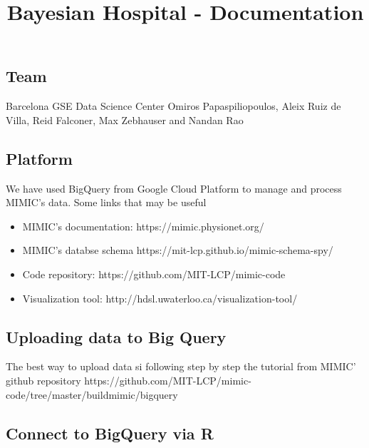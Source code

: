 \documentclass[12pt]{article}
\begin{document}
\def\moveover{\hskip 4.2 true in}





\bigskip

\bigskip


\title{Bayesian Hospital - Documentation}

\date{}

\maketitle

\subsection*{Team}

Barcelona GSE Data Science Center
Omiros Papaspiliopoulos, Aleix Ruiz de Villa, Reid Falconer, Max Zebhauser and Nandan Rao

\subsection*{Platform}

We have used BigQuery from Google Cloud Platform to manage and process MIMIC's data. Some links that may be useful

\begin{itemize}
	\item MIMIC's documentation: https://mimic.physionet.org/
	\item MIMIC's databse schema https://mit-lcp.github.io/mimic-schema-spy/
	\item Code repository: https://github.com/MIT-LCP/mimic-code
	\item Visualization tool: http://hdsl.uwaterloo.ca/visualization-tool/
\end{itemize}

\subsection*{Uploading data to Big Query}

The best way to upload data si following step by step the tutorial from MIMIC' github repository 
https://github.com/MIT-LCP/mimic-code/tree/master/buildmimic/bigquery

\subsection*{Connect to BigQuery via R}
\end{document}
